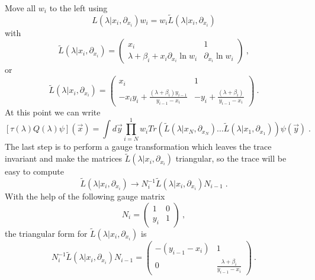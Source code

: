 \documentclass[a4paper,11pt]{article}
\begin{document}
Move all $w_i$ to the left using
\begin{equation}
\label{TQ5a}
L(\lambda|x_i,\partial_{x_i})w_i=w_i{\tilde L}(\lambda|x_i,\partial_{x_i})
\end{equation}
with
\begin{equation}
\label{TQ5}
{\tilde L}(\lambda|x_i,\partial_{x_i})=\left(\begin{array}{cc}
          x_i      & 1  \\
           \lambda+\beta _i+x_i\partial_{x_i}\ln w_i     &  \partial_{x_i}\ln w_i
         \end{array}\right ) ~,
\end{equation}
or
\begin{equation}
\label{TQ6}
{\tilde L}(\lambda|x_i,\partial_{x_i})=\left(\begin{array}{cc}
          x_i      & 1  \\
           -x_iy_i+\frac{(\lambda +\beta_i)y_{i-1}}{y_{i-1}-x_i}  & -y_i+\frac{(\lambda +\beta_i)}{y_{i-1}-x_i}
         \end{array}\right ) ~.
\end{equation}
At this point we can write
\begin{equation}
\label{TQ7}
[\tau(\lambda )Q(\lambda)\psi]({\vec x})
     =\int d{\vec y}\prod _{i=N}^1 w_i Tr\left(
     {\tilde L}(\lambda|x_N,\partial_{x_N}) \ldots
     {\tilde L}(\lambda|x_1,\partial_{x_1})\right)\psi({\vec y})\;.
\end{equation}
The last step is to perform a gauge transformation which leaves the trace
invariant and make the matrices ${\tilde L}(\lambda|x_i,\partial_{x_i})$
triangular, so the trace will be easy to compute
\begin{equation}
\label{TQ8}
{\tilde L}(\lambda|x_i,\partial_{x_i})
    \to N_{i}^{-1}{\tilde L}(\lambda|x_i,\partial_{x_i}) N_{i-1}\;.
\end{equation}
With the help of the following gauge matrix
\begin{equation}
\label{TQ9}
N_i=\left(\begin{array}{cc}
          1      & 0  \\
           y_i  &1
         \end{array}\right ) ~,
\end{equation}
the triangular form for ${\tilde L}(\lambda|x_i,\partial_{x_i})$ is
\begin{equation}
\label{TQ10}
N_i^{-1}{\tilde L}(\lambda|x_i,\partial_{x_i}) N_{i-1}=\left(\begin{array}{cc}
          -(y_{i-1}-x_i)      & 1  \\
          0  & \frac{\lambda +\beta_i}{y_{i-1}-x_i}
         \end{array}\right ) ~.
\end{equation}
\end{document}

